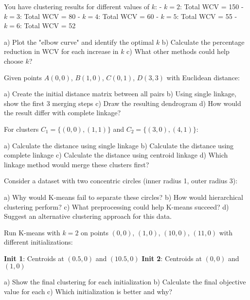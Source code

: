 \documentclass{article}
\newcounter{exercise}
\begin{document}
\begin{tcolorbox}[colback=gray!5!white,colframe=gray!75!black,title=Problem \stepcounter{exercise}: Choosing Optimal K]

You have clustering results for different values of $k$:
- $k=2$: Total WCV = 150
- $k=3$: Total WCV = 80  
- $k=4$: Total WCV = 60
- $k=5$: Total WCV = 55
- $k=6$: Total WCV = 52

a) Plot the "elbow curve" and identify the optimal $k$
b) Calculate the percentage reduction in WCV for each increase in $k$
c) What other methods could help choose $k$?
\end{tcolorbox}

\begin{tcolorbox}[colback=gray!5!white,colframe=gray!75!black,title=Problem \stepcounter{exercise}: Hierarchical Clustering Steps]

Given points $A(0,0)$, $B(1,0)$, $C(0,1)$, $D(3,3)$ with Euclidean distance:

a) Create the initial distance matrix between all pairs
b) Using single linkage, show the first 3 merging steps
c) Draw the resulting dendrogram
d) How would the result differ with complete linkage?
\end{tcolorbox}

\begin{tcolorbox}[colback=gray!5!white,colframe=gray!75!black,title=Problem \stepcounter{exercise}: Linkage Criteria Comparison]

For clusters $C_1 = \{(0,0), (1,1)\}$ and $C_2 = \{(3,0), (4,1)\}$:

a) Calculate the distance using single linkage
b) Calculate the distance using complete linkage  
c) Calculate the distance using centroid linkage
d) Which linkage method would merge these clusters first?
\end{tcolorbox}

\begin{tcolorbox}[colback=gray!5!white,colframe=gray!75!black,title=Problem \stepcounter{exercise}: K-Means Limitations]

Consider a dataset with two concentric circles (inner radius 1, outer radius 3):

a) Why would K-means fail to separate these circles?
b) How would hierarchical clustering perform?
c) What preprocessing could help K-means succeed?
d) Suggest an alternative clustering approach for this data.
\end{tcolorbox}

\begin{tcolorbox}[colback=gray!5!white,colframe=gray!75!black,title=Problem \stepcounter{exercise}: Initialization Effects]

Run K-means with $k=2$ on points $(0,0)$, $(1,0)$, $(10,0)$, $(11,0)$ with different initializations:

\textbf{Init 1}: Centroids at $(0.5, 0)$ and $(10.5, 0)$
\textbf{Init 2}: Centroids at $(0, 0)$ and $(1, 0)$

a) Show the final clustering for each initialization
b) Calculate the final objective value for each
c) Which initialization is better and why?
\end{tcolorbox}
\end{document}
